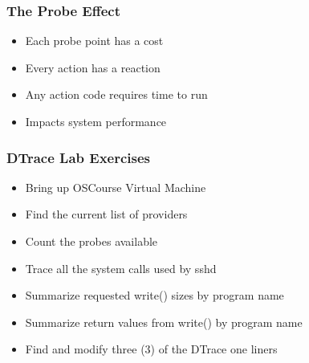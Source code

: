 \documentclass[pdftex]{beamer}
\begin{document}
\begin{frame}
  \frametitle{The Probe Effect}
  \begin{itemize}
  \item Each probe point has a cost
  \item Every action has a reaction
  \item Any action code requires time to run
  \item Impacts system performance
  \end{itemize}
\end{frame}

\begin{frame}
  \frametitle{DTrace Lab Exercises}
  \begin{itemize}
  \item Bring up OSCourse Virtual Machine
  \item Find the current list of providers
  \item Count the probes available
  \item Trace all the system calls used by sshd
  \item Summarize requested write() sizes by program name
  \item Summarize return values from write() by program name
  \item Find and modify three (3) of the DTrace one liners
  \end{itemize}
\end{frame}
\end{document}

